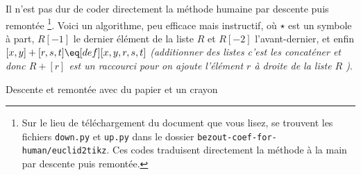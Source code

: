 Il n'est pas dur de coder directement la méthode humaine par descente puis remontée
\footnote{
	Sur le lieu de téléchargement du document que vous lisez, se trouvent les fichiers \texttt{down.py} et \texttt{up.py} dans le dossier \texttt{bezout-coef-for-human/euclid2tikz}.
	Ces codes traduisent directement la méthode à la main par descente puis remontée.
}.
Voici un algorithme, peu efficace mais instructif, où $\star$ est un symbole à part, $R[-1]$ le dernier élément de la liste $R$ et $R[-2]$ l'avant-dernier, et enfin $[x, y] + [r, s, t] \eq[def] [x, y, r, s, t]$ \emph{(additionner des listes c'est les concaténer et donc $R + [r]$ est un raccourci pour \emph{\og on ajoute l'élément $r$ à droite de la liste $R$ \fg})}.


{\small
\begin{algo}[frame]
	\caption{Descente et remontée avec du papier et un crayon} \label{algo-human-paper}
	\BlankLine
\end{algo}
}


